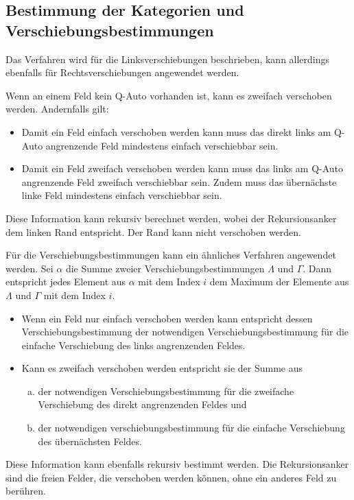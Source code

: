 \documentclass[a4paper,10pt,ngerman]{scrartcl}
\begin{document}
\subsection{Bestimmung der Kategorien und Verschiebungsbestimmungen}
Das Verfahren wird für die Linksverschiebungen beschrieben, kann allerdings ebenfalls für Rechtsverschiebungen angewendet werden.

Wenn an einem Feld kein Q-Auto vorhanden ist, kann es zweifach verschoben werden.
Andernfalls gilt:
\begin{itemize}
    \item Damit ein Feld einfach verschoben werden kann muss das direkt links am Q-Auto angrenzende Feld mindestens einfach verschiebbar sein.
    \item Damit ein Feld zweifach verschoben werden kann muss das links am Q-Auto angrenzende Feld zweifach verschiebbar sein.
          Zudem muss das übernächste linke Feld mindestens einfach verschiebbar sein.
\end{itemize}
Diese Information kann rekursiv berechnet werden, wobei der Rekursionsanker dem linken Rand entspricht.
Der Rand kann nicht verschoben werden.

Für die Verschiebungsbestimmungen kann ein ähnliches Verfahren angewendet werden.
Sei $\alpha$ die Summe zweier Verschiebungsbestimmungen $\Lambda$ und $\Gamma$.
Dann entspricht jedes Element aus $\alpha$ mit dem Index $i$ dem Maximum der Elemente aus $\Lambda$ und $\Gamma$ mit dem Index $i$.

\begin{itemize}
    \item Wenn ein Feld nur einfach verschoben werden kann entspricht dessen Verschiebungsbestimmung der notwendigen Verschiebungsbestimmung für die einfache Verschiebung des links angrenzenden Feldes.
    \item Kann es zweifach verschoben werden entspricht sie der Summe aus
          \begin{enumerate}[a)]
              \item der notwendigen Verschiebungsbestimmung für die zweifache Verschiebung des direkt angrenzenden Feldes und
              \item der notwendigen verschiebungsbestimmung für die einfache Verschiebung des übernächsten Feldes.
          \end{enumerate}
\end{itemize}
Diese Information kann ebenfalls rekursiv bestimmt werden.
Die Rekursionsanker sind die freien Felder, die verschoben werden können, ohne ein anderes Feld zu berühren.
\end{document}
